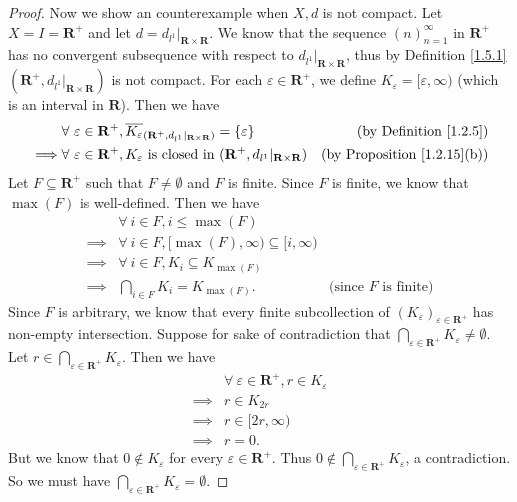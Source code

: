 \begin{proof}
    Now we show an counterexample when \(X, d\) is not compact.
    Let \(X = I = \mathbf{R}^+\) and let \(d = d_{l^1}|_{\mathbf{R} \times \mathbf{R}}\).
    We know that the sequence \((n)_{n = 1}^\infty\) in \(\mathbf{R}^+\) has no convergent subsequence with respect to \(d_{l^1}|_{\mathbf{R} \times \mathbf{R}}\), thus by Definition \ref{1.5.1} \((\mathbf{R}^+, d_{l^1}|_{\mathbf{R} \times \mathbf{R}})\) is not compact.
    For each \(\varepsilon \in \mathbf{R}^+\), we define \(K_\varepsilon = [\varepsilon, \infty)\) (which is an interval in \(\mathbf{R}\)).
    Then we have
    \begin{align*}
                 & \forall\ \varepsilon \in \mathbf{R}^+, \overline{K_\varepsilon}_{(\mathbf{R}^+, d_{l^1}|_{\mathbf{R} \times \mathbf{R}})} = \{\varepsilon\} & \text{(by Definition \ref{1.2.5})}      \\
        \implies & \forall\ \varepsilon \in \mathbf{R}^+, K_\varepsilon \text{ is closed in } (\mathbf{R}^+, d_{l^1}|_{\mathbf{R} \times \mathbf{R}})          & \text{(by Proposition \ref{1.2.15}(b))}
    \end{align*}
    Let \(F \subseteq \mathbf{R}^+\) such that \(F \neq \emptyset\) and \(F\) is finite.
    Since \(F\) is finite, we know that \(\max(F)\) is well-defined.
    Then we have
    \begin{align*}
                 & \forall\ i \in F, i \leq \max(F)                                                           \\
        \implies & \forall\ i \in F, [\max(F), \infty) \subseteq [i, \infty)                                  \\
        \implies & \forall\ i \in F, K_i \subseteq K_{\max(F)}                                                \\
        \implies & \bigcap_{i \in F} K_i = K_{\max(F)}.                      & \text{(since \(F\) is finite)}
    \end{align*}
    Since \(F\) is arbitrary, we know that every finite subcollection of \((K_\varepsilon)_{\varepsilon \in \mathbf{R}^+}\) has non-empty intersection.
    Suppose for sake of contradiction that \(\bigcap_{\varepsilon \in \mathbf{R}^+} K_\varepsilon \neq \emptyset\).
    Let \(r \in \bigcap_{\varepsilon \in \mathbf{R}^+} K_\varepsilon\).
    Then we have
    \begin{align*}
                 & \forall\ \varepsilon \in \mathbf{R}^+, r \in K_\varepsilon \\
        \implies & r \in K_{2r}                                               \\
        \implies & r \in [2r, \infty)                                         \\
        \implies & r = 0.
    \end{align*}
    But we know that \(0 \notin K_\varepsilon\) for every \(\varepsilon \in \mathbf{R}^+\).
    Thus \(0 \notin \bigcap_{\varepsilon \in \mathbf{R}^+} K_\varepsilon\), a contradiction.
    So we must have \(\bigcap_{\varepsilon \in \mathbf{R}^+} K_\varepsilon = \emptyset\).
\end{proof}
